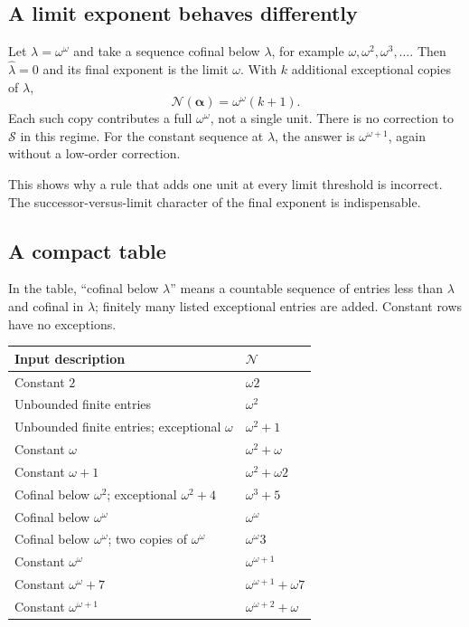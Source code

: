 \documentclass[11pt,a4paper]{article}
\theoremstyle{definition}
\newcommand{\OpN}{\mathcal N}
\newcommand{\OpS}{\mathcal S}
\newcommand{\seq}[1]{\boldsymbol{#1}}
\begin{document}
\subsection{A limit exponent behaves differently}

Let $\lambda=\omega^\omega$ and take a sequence cofinal below $\lambda$, for example $\omega,\omega^2,\omega^3,\ldots$. Then $\widehat\lambda=0$ and its final exponent is the limit $\omega$. With $k$ additional exceptional copies of $\lambda$,
\begin{equation}\label{block:eq:limit-exponent}
 \OpN(\seq\alpha)=\omega^\omega(k+1).
\end{equation}
Each such copy contributes a full $\omega^\omega$, not a single unit. There is no correction to $\OpS$ in this regime. For the constant sequence at $\lambda$, the answer is $\omega^{\omega+1}$, again without a low-order correction.

This shows why a rule that adds one unit at every limit threshold is incorrect. The successor-versus-limit character of the final exponent is indispensable.

\subsection{A compact table}

In the table, ``cofinal below $\lambda$'' means a countable sequence of entries less than $\lambda$ and cofinal in $\lambda$; finitely many listed exceptional entries are added. Constant rows have no exceptions.

\begin{center}\small
\begin{tabular}{@{}p{}p{}@{}}
\toprule
Input description & $\OpN$ \\
\midrule
Constant $2$ & $\omega2$ \\
Unbounded finite entries & $\omega^2$ \\
Unbounded finite entries; exceptional $\omega$ & $\omega^2+1$ \\
Constant $\omega$ & $\omega^2+\omega$ \\
Constant $\omega+1$ & $\omega^2+\omega2$ \\
Cofinal below $\omega^2$; exceptional $\omega^2+4$ & $\omega^3+5$ \\
Cofinal below $\omega^\omega$ & $\omega^\omega$ \\
Cofinal below $\omega^\omega$; two copies of $\omega^\omega$ & $\omega^\omega3$ \\
Constant $\omega^\omega$ & $\omega^{\omega+1}$ \\
Constant $\omega^\omega+7$ & $\omega^{\omega+1}+\omega7$ \\
Constant $\omega^{\omega+1}$ & $\omega^{\omega+2}+\omega$ \\
\bottomrule
\end{tabular}
\end{center}
\end{document}
